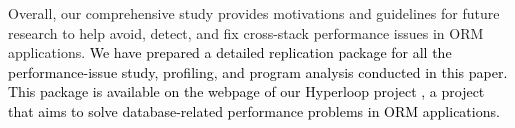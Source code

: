 Overall, our comprehensive study provides motivations and guidelines for future research to help avoid, detect, and fix cross-stack performance issues in ORM applications. 
\textcolor{black}{
We have prepared a detailed replication package for all the performance-issue study, profiling, and program analysis conducted in this paper. This package is available
on the webpage of our Hyperloop project \cite{website}, a project
that aims to solve database-related performance problems in ORM applications.} %

